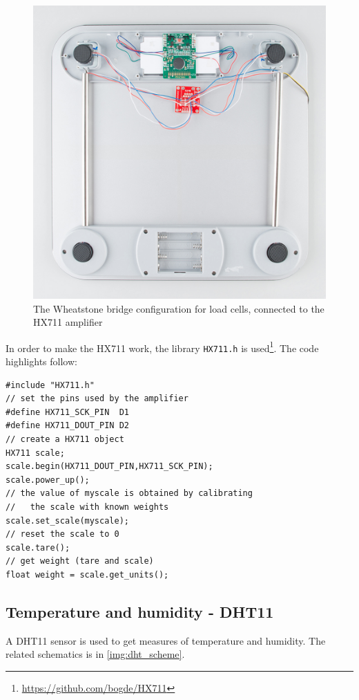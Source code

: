 \begin{figure} 
\caption{The Wheatstone bridge configuration for load cells, connected to the HX711 amplifier}\label{img:loadcells_scheme}
\centering
\includegraphics{latex/img/loadcells_scheme.png}
\end{figure}

In order to make the HX711 work, the library \texttt{HX711.h} is used\footnote{\url{https://github.com/bogde/HX711}}. The code highlights follow:
\begin{lstlisting}
#include "HX711.h"
// set the pins used by the amplifier
#define HX711_SCK_PIN  D1         
#define HX711_DOUT_PIN D2
// create a HX711 object
HX711 scale;                      
scale.begin(HX711_DOUT_PIN,HX711_SCK_PIN);
scale.power_up();
// the value of myscale is obtained by calibrating 
//   the scale with known weights
scale.set_scale(myscale);         
// reset the scale to 0
scale.tare();                     
// get weight (tare and scale)
float weight = scale.get_units(); 
\end{lstlisting}

\subsection{Temperature and humidity - DHT11}
A DHT11 sensor is used to get measures of temperature and humidity. The related schematics is in \autoref{img:dht_scheme}.


